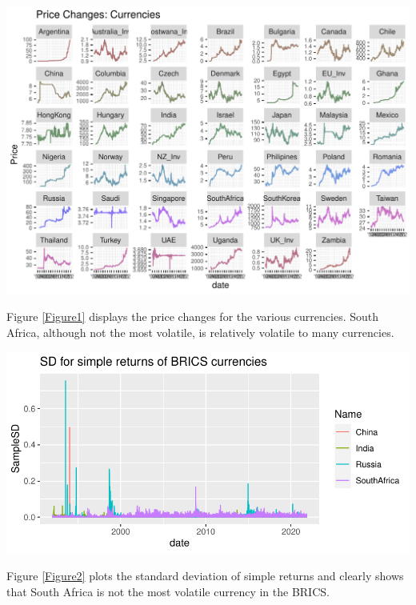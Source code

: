 \documentclass[11pt,preprint, authoryear]{elsarticle}
\let\origfigure\figure
\let\endorigfigure\endfigure
\renewenvironment{figure}[1][2] {
    \expandafter\origfigure\expandafter[H]
} {
    \endorigfigure
}
\numberwithin{equation}{section}
\numberwithin{figure}{section}
\numberwithin{table}{section}
\begin{document}
\begin{figure}[H]

{\centering \includegraphics{Question5_files/figure-latex/Figure1-1} 

}

\caption{Caption Here \label{Figure1}}\label{fig:Figure1}
\end{figure}

Figure \ref{Figure1} displays the price changes for the various
currencies. South Africa, although not the most volatile, is relatively
volatile to many currencies.

\begin{figure}[H]

{\centering \includegraphics{Question5_files/figure-latex/Figure2-1} 

}

\caption{Caption Here \label{Figure2}}\label{fig:Figure2}
\end{figure}

Figure \ref{Figure2} plots the standard deviation of simple returns and
clearly shows that South Africa is not the most volatile currency in the
BRICS.
\end{document}
